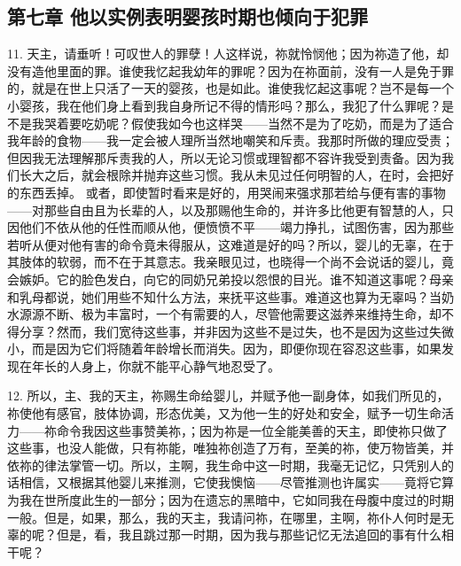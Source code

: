 \subsection{第七章 他以实例表明婴孩时期也倾向于犯罪}

11. 天主，请垂听！可叹世人的罪孽！人这样说，祢就怜悯他；因为祢造了他，却没有造他里面的罪。谁使我忆起我幼年的罪呢？因为在祢面前，没有一人是免于罪的，就是在世上只活了一天的婴孩，也是如此。谁使我忆起这事呢？岂不是每一个小婴孩，我在他们身上看到我自身所记不得的情形吗？那么，我犯了什么罪呢？是不是我哭着要吃奶呢？假使我如今也这样哭——当然不是为了吃奶，而是为了适合我年龄的食物——我一定会被人理所当然地嘲笑和斥责。我那时所做的理应受责；但因我无法理解那斥责我的人，所以无论习惯或理智都不容许我受到责备。因为我们长大之后，就会根除并抛弃这些习惯。我从未见过任何明智的人，在时，会把好的东西丢掉。 或者，即使暂时看来是好的，用哭闹来强求那若给与便有害的事物——对那些自由且为长辈的人，以及那赐他生命的，并许多比他更有智慧的人，只因他们不依从他的任性而顺从他，便愤愤不平——竭力挣扎，试图伤害，因为那些若听从便对他有害的命令竟未得服从，这难道是好的吗？所以，婴儿的无辜，在于其肢体的软弱，而不在于其意志。我亲眼见过，也晓得一个尚不会说话的婴儿，竟会嫉妒。它的脸色发白，向它的同奶兄弟投以怨恨的目光。谁不知道这事呢？母亲和乳母都说，她们用些不知什么方法，来抚平这些事。难道这也算为无辜吗？当奶水源源不断、极为丰富时，一个有需要的人，尽管他需要这滋养来维持生命，却不得分享？然而，我们宽待这些事，并非因为这些不是过失，也不是因为这些过失微小，而是因为它们将随着年龄增长而消失。因为，即便你现在容忍这些事，如果发现在年长的人身上，你就不能平心静气地忍受了。\par

12. 所以，主、我的天主，祢赐生命给婴儿，并赋予他一副身体，如我们所见的，祢使他有感官，肢体协调，形态优美，又为他一生的好处和安全，赋予一切生命活力——祢命令我因这些事赞美祢，；因为祢是一位全能美善的天主，即使祢只做了这些事，也没人能做，只有祢能，唯独祢创造了万有，至美的祢，使万物皆美，并依祢的律法掌管一切。所以，主啊，我生命中这一时期，我毫无记忆，只凭别人的话相信，又根据其他婴儿来推测，它使我懊恼——尽管推测也许属实——竟将它算为我在世所度此生的一部分；因为在遗忘的黑暗中，它如同我在母腹中度过的时期一般。但是，如果，那么，我的天主，我请问祢，在哪里，主啊，祢仆人何时是无辜的呢？但是，看，我且跳过那一时期，因为我与那些记忆无法追回的事有什么相干呢？\par


